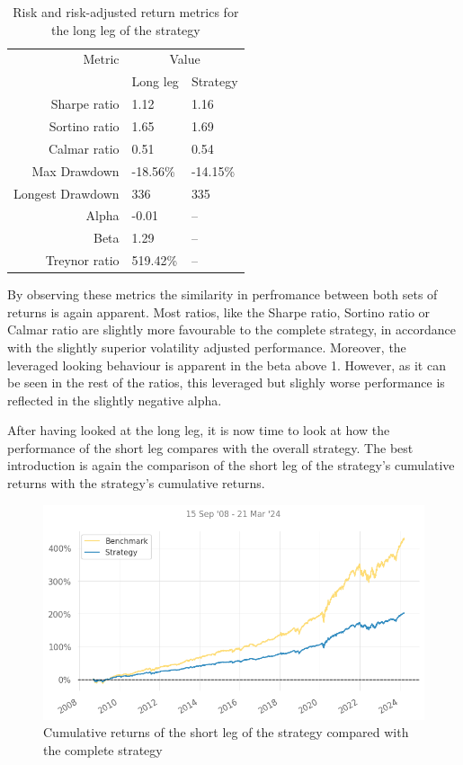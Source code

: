 \begin{table}[ht]
    \centering
    \begin{tabular}{rll}
        \toprule
        Metric & \multicolumn{2}{c}{Value} \\ 
        \cmidrule(lr){2-3}
            & Long leg & Strategy \\
        \midrule
        Sharpe ratio & 1.12 & 1.16 \\
        Sortino ratio & 1.65 & 1.69 \\
        Calmar ratio & 0.51 & 0.54 \\
        Max Drawdown & -18.56\% & -14.15\% \\
        Longest Drawdown & 336 & 335 \\
        Alpha & -0.01 & -- \\
        Beta & 1.29 & -- \\
        Treynor ratio & 519.42\% & -- \\
        \bottomrule
    \end{tabular}
    \caption{Risk and risk-adjusted return metrics for the long leg of the strategy}
    \label{table:risk-adjusted-long-vs-strat}
\end{table}

By observing these metrics the similarity in perfromance between both sets of returns is again apparent. Most ratios, like the Sharpe ratio, Sortino ratio or Calmar ratio are slightly more favourable to the complete strategy, in accordance with the slightly superior volatility adjusted performance. Moreover, the leveraged looking behaviour is apparent in the beta above 1. However, as it can be seen in the rest of the ratios, this leveraged but slighly worse performance is reflected in the slightly negative alpha. 


After having looked at the long leg, it is now time to look at how the performance of the short leg compares with the overall strategy. The best introduction is again the comparison of the short leg of the strategy's cumulative returns with the strategy's cumulative returns.

\begin{figure}[ht]
    \captionsetup{justification=centering}
    \includegraphics[width=\linewidth]{assets/short-vs-strat.png}
    \caption{Cumulative returns of the short leg of the strategy compared with the complete strategy}
    \label{fig:short-vs-strat}
\end{figure}

